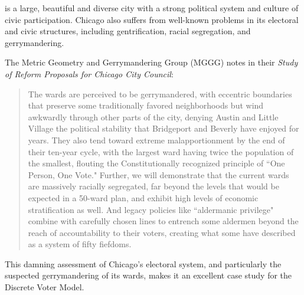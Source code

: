  is a large, beautiful and diverse city with a strong political system and culture of civic participation. Chicago also suffers from well-known problems in its electoral and civic structures, including gentrification, racial segregation, and gerrymandering.

The Metric Geometry and Gerrymandering Group (MGGG) notes in their \textit{Study of Reform Proposals for Chicago City Council}:

\begin{quote}
 The wards are perceived to be gerrymandered, with eccentric boundaries that preserve some traditionally favored neighborhoods but wind awkwardly through other parts of the city, denying Austin and Little Village the political stability that Bridgeport and Beverly have enjoyed for years. They also tend toward extreme malapportionment by the end of their ten-year cycle, with the largest ward having twice the population of the smallest, flouting the Constitutionally recognized principle of ``One Person, One Vote." Further, we will demonstrate that the current wards are massively racially segregated, far beyond the levels that would be expected in a 50-ward plan, and exhibit high levels of economic stratification as well. And legacy policies like ``aldermanic privilege" combine with carefully chosen lines to entrench some aldermen beyond the reach of accountability to their voters, creating what some have described as a system of fifty fiefdoms.\cite{chi_report}
\end{quote}

This damning assessment of Chicago's electoral system, and particularly the suspected gerrymandering of its wards, makes it an excellent case study for the Discrete Voter Model.

